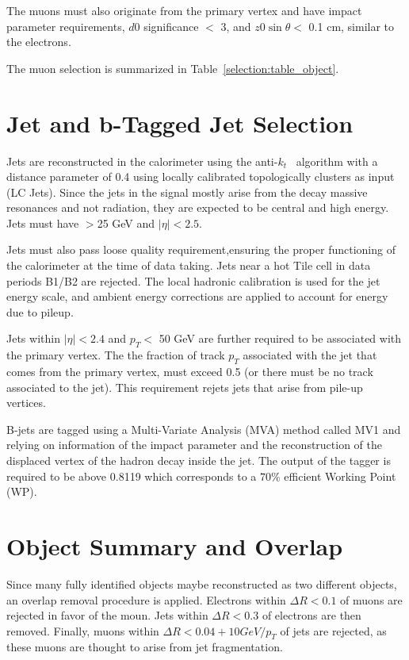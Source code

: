 The muons must also originate from the primary vertex and have impact parameter requirements, $d0$ significance $<$ 3, and $z0\sin{\theta} <$ 0.1 cm, similar to the electrons. 


The muon selection is summarized in Table~\ref{selection:table_object}. 

\section{Jet and b-Tagged Jet Selection}

Jets are reconstructed in the calorimeter using the anti-$k_t$~\cite{Cacciari:2008gp} algorithm
with a distance parameter of 0.4 using locally calibrated
topologically clusters as input (LC Jets). Since the jets in the \tth
signal mostly arise from the decay massive resonances and not radiation,
they are expected to be central and high energy. Jets must have \pt$>$25 GeV and 
$|\eta|<2.5$. 

Jets must also pass loose quality requirement,ensuring the proper
functioning of the calorimeter at the time of data taking. Jets near a hot Tile cell in data periods
B1/B2 are rejected. The local hadronic calibration is used for
the jet energy scale, and ambient energy corrections are applied to account
for energy due to pileup.

Jets within $|\eta| < 2.4$ and $p_T <$ 50 GeV are further required to be
associated with the primary vertex. The the fraction of track $p_T$ associated with the jet that comes from the primary vertex,
must exceed 0.5 (or there must be no track associated to the jet). This requirement rejets jets that arise from pile-up 
vertices.

B-jets are tagged using a Multi-Variate Analysis (MVA) method called MV1 and relying on information
of the impact parameter and the reconstruction of the displaced vertex of the
hadron decay inside the jet\cite{ATLAS-CONF-2011-102}.
The output of the tagger is required to be above 0.8119 which corresponds to a $70\%$ efficient Working Point (WP).

\section{Object Summary and Overlap}

Since many fully identified objects maybe reconstructed as two different objects, an overlap removal procedure is applied.
Electrons within $\Delta R < 0.1$ of muons are rejected in favor of the moun. Jets within $\Delta R < 0.3$ of electrons are 
then removed. Finally, muons within $\Delta R < 0.04 + 10 GeV/p_{T}$ of jets are rejected, as these muons are thought to
arise from jet fragmentation. 

